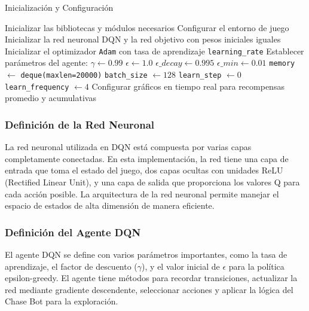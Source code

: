 \documentclass[10pt]{article}
\begin{document}
\begin{algorithm}
	\caption{Inicialización y Configuración}
	\begin{algorithmic}[1]
		\State Inicializar las bibliotecas y módulos necesarios
		\State Configurar el entorno de juego
		\State Inicializar la red neuronal DQN y la red objetivo con pesos iniciales iguales
		\State Inicializar el optimizador \texttt{Adam} con tasa de aprendizaje \texttt{learning\_rate}
		\State Establecer parámetros del agente:
		\State \hspace{1em} \(\gamma \leftarrow 0.99\) 
		\State \hspace{1em} \(\epsilon \leftarrow 1.0\) 
		\State \hspace{1em} \(\epsilon\_decay \leftarrow 0.995\) 
		\State \hspace{1em} \(\epsilon\_min \leftarrow 0.01\) 
		\State \hspace{1em} \texttt{memory} \(\leftarrow\) \texttt{deque(maxlen=20000)} 
		\State \hspace{1em} \texttt{batch\_size} \(\leftarrow 128\) 
		\State \hspace{1em} \texttt{learn\_step} \(\leftarrow 0\) 
		\State \hspace{1em} \texttt{learn\_frequency} \(\leftarrow 4\) 
		\State Configurar gráficos en tiempo real para recompensas promedio y acumulativas
	\end{algorithmic}
\end{algorithm}



\subsubsection{Definición de la Red Neuronal}
La red neuronal utilizada en DQN está compuesta por varias capas completamente conectadas. En esta implementación, la red tiene una capa de entrada que toma el estado del juego, dos capas ocultas con unidades ReLU (Rectified Linear Unit), y una capa de salida que proporciona los valores Q para cada acción posible. La arquitectura de la red neuronal permite manejar el espacio de estados de alta dimensión de manera eficiente.

\subsubsection{Definición del Agente DQN}
El agente DQN se define con varios parámetros importantes, como la tasa de aprendizaje, el factor de descuento (\(\gamma\)), y el valor inicial de \(\epsilon\) para la política epsilon-greedy. El agente tiene métodos para recordar transiciones, actualizar la red mediante gradiente descendente, seleccionar acciones y aplicar la lógica del Chase Bot para la exploración.
\end{document}
